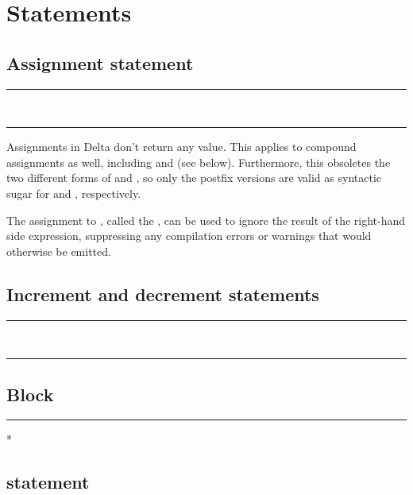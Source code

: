 
\chapter{Statements}

\section{Assignment statement}

\begin{grammar}
\rule{assignment-statement}  \code{=}  \code{;}\\
\rule{assignment-statement} \code{_} \code{=}  \code{;}
\end{grammar}

Assignments in Delta don't return any value. This applies to compound
assignments as well, including \code{++} and \code{--} (see below). Furthermore,
this obsoletes the two different forms of \code{++} and \code{--}, so only the
postfix versions are valid as syntactic sugar for  and ,
respectively.

The assignment to \code{_}, called the , can
be used to ignore the result of the right-hand side expression, suppressing any
compilation errors or warnings that would otherwise be emitted.

\section{Increment and decrement statements}

\begin{grammar}
\rule{increment-statement}  \code{++} \code{;}\\
\rule{decrement-statement}  \code{--} \code{;}
\end{grammar}

\section{Block}

\begin{grammar}
\rule{block} \code{\{} * \code{\}}
\end{grammar}

\section{ statement}

